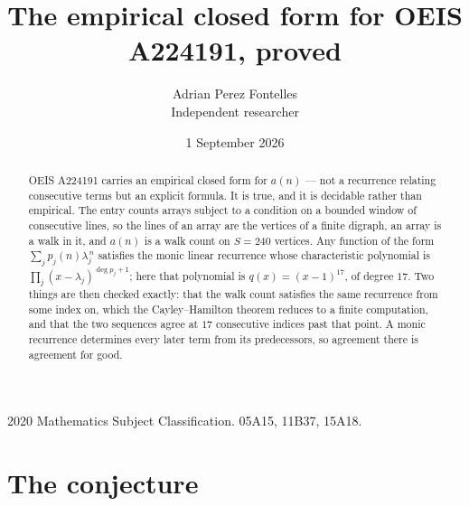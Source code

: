 \documentclass[11pt,a4paper]{article}
\title{The empirical closed form for OEIS A224191, proved}
\author{Adrian Perez Fontelles\\ \small Independent researcher}
\date{1 September 2026}
\theoremstyle{plain}
\theoremstyle{definition}
\begin{document}
\maketitle

\begin{abstract}
OEIS A224191 carries an empirical closed form for $a(n)$ --- not a recurrence relating
consecutive terms but an explicit formula. It is true, and it is decidable rather than
empirical. The entry counts arrays subject to a condition on a bounded window of consecutive lines, so the lines of an array are the
vertices of a finite digraph, an array is a walk in it, and $a(n)$ is a walk count on
$S=240$ vertices. Any function of the form $\sum_j p_j(n)\lambda_j^{\,n}$ satisfies the
monic linear recurrence whose characteristic polynomial is
$\prod_j(x-\lambda_j)^{\deg p_j+1}$; here that polynomial is $q(x)=(x-1)^{17}$, of degree
$17$. Two things are then checked exactly: that the walk count satisfies the same
recurrence from some index on, which the Cayley--Hamilton theorem reduces to a finite
computation, and that the two sequences agree at $17$ consecutive indices past that
point. A monic recurrence determines every later term from its predecessors, so agreement
there is agreement for good.
\end{abstract}

\noindent\small 2020 Mathematics Subject Classification. 05A15, 11B37, 15A18.\normalsize

\section{The conjecture}
\end{document}
